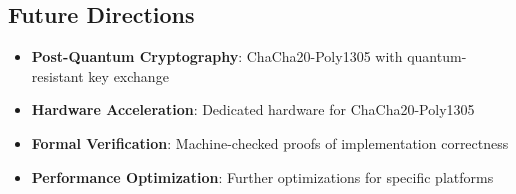 \documentclass[11pt,a4paper]{article}
\begin{document}
\subsection{Future Directions}

\begin{itemize}
         \item \textbf{Post-Quantum Cryptography}: ChaCha20-Poly1305 with quantum-resistant key exchange
     \item \textbf{Hardware Acceleration}: Dedicated hardware for ChaCha20-Poly1305
     \item \textbf{Formal Verification}: Machine-checked proofs of implementation correctness
     \item \textbf{Performance Optimization}: Further optimizations for specific platforms
\end{itemize}
\end{document}
